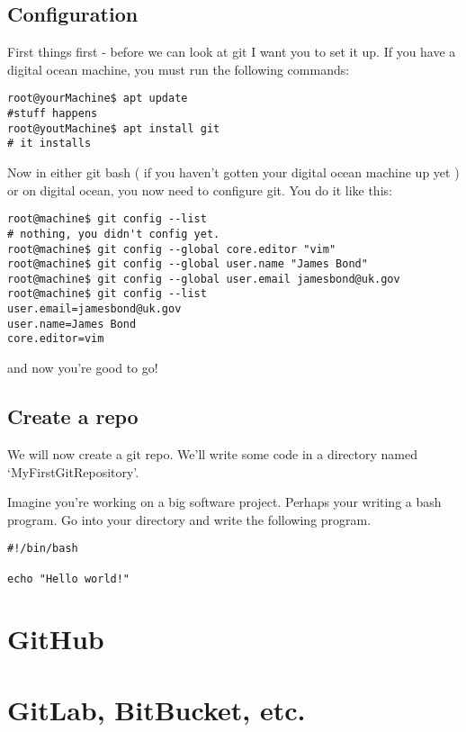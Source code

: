 \documentclass[10pt]{article}
\begin{document}
\subsection{Configuration}
First things first - before we can look at git I want you to set it up. If you
have a digital ocean machine, you must run the following commands:

\begin{lstlisting}[style=term]
root@yourMachine$ apt update
#stuff happens
root@youtMachine$ apt install git
# it installs
\end{lstlisting}

Now in either git bash ( if you haven't gotten your digital ocean machine up yet
) or on digital ocean, you now need to configure git. You do it like this:

\begin{lstlisting}[style=term]
root@machine$ git config --list
# nothing, you didn't config yet.
root@machine$ git config --global core.editor "vim"
root@machine$ git config --global user.name "James Bond"
root@machine$ git config --global user.email jamesbond@uk.gov
root@machine$ git config --list
user.email=jamesbond@uk.gov
user.name=James Bond
core.editor=vim
\end{lstlisting}

and now you're good to go!

\subsection{Create a repo}
We will now create a git repo. We'll write some code in a directory named
`MyFirstGitRepository'.

Imagine you're working on a big software project. Perhaps your writing a bash
program. Go into your directory and write the following program.

\begin{lstlisting}[style=bash]
#!/bin/bash

echo "Hello world!"
\end{lstlisting}


\section{GitHub}

\section{GitLab, BitBucket, etc.}
\end{document}
